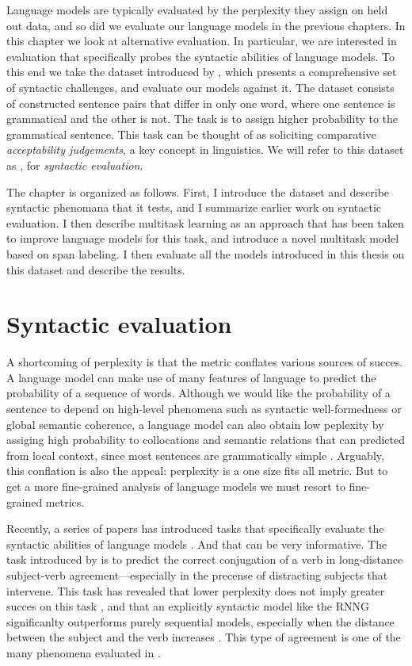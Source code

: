 % 

Language models are typically evaluated by the perplexity they assign on held out data, and so did we evaluate our language models in the previous chapters. In this chapter we look at alternative evaluation. In particular, we are interested in evaluation that specifically probes the syntactic abilities of language models. To this end we take the dataset introduced by \citet{linzen2018targeted}, which presents a comprehensive set of syntactic challenges, and evaluate our models against it. The dataset consists of constructed sentence pairs that differ in only one word, where one sentence is grammatical and the other is not. The task is to assign higher probability to the grammatical sentence. This task can be thought of as soliciting comparative \textit{acceptability judgements}, a key concept in linguistics. We will refer to this dataset as \syneval, for \textit{syntactic evaluation}.

The chapter is organized as follows. First, I introduce the \syneval dataset and describe syntactic phenomana that it tests, and I summarize earlier work on syntactic evaluation. I then describe multitask learning as an approach that has been taken to improve language models for this task, and introduce a novel multitask model based on span labeling. I then evaluate all the models introduced in this thesis on this dataset and describe the results.

\section{Syntactic evaluation}
A shortcoming of perplexity is that the metric conflates various sources of succes. A language model can make use of many features of language to predict the probability of a sequence of words. Although we would like the probability of a sentence to depend on high-level phenomena such as syntactic well-formedness or global semantic coherence, a language model can also obtain low peplexity by assiging high probability to collocations and semantic relations that can predicted from local context, since most sentences are grammatically simple \citep{linzen2018targeted}. Arguably, this conflation is also the appeal: perplexity is a one size fits all metric. But to get a more fine-grained analysis of language models we must resort to fine-grained metrics.

Recently, a series of papers has introduced tasks that specifically evaluate the syntactic abilities of language models \citep{linzen2016syntax,gulordava2018colorless,linzen2018targeted}. And that can be very informative. The task introduced by \citet{linzen2016syntax} is to predict the correct conjugation of a verb in long-distance subject-verb agreement---especially in the precense of distracting subjects that intervene. This task has revealed that lower perplexity does not imply greater succes on this task \citep{tran2018recurrent}, and that an explicitly syntactic model like the RNNG significanlty outperforms purely sequential models, especially when the distance between the subject and the verb increases \citep{kuncoro2018learn}. This type of agreement is one of the many phenomena evaluated in \syneval.


